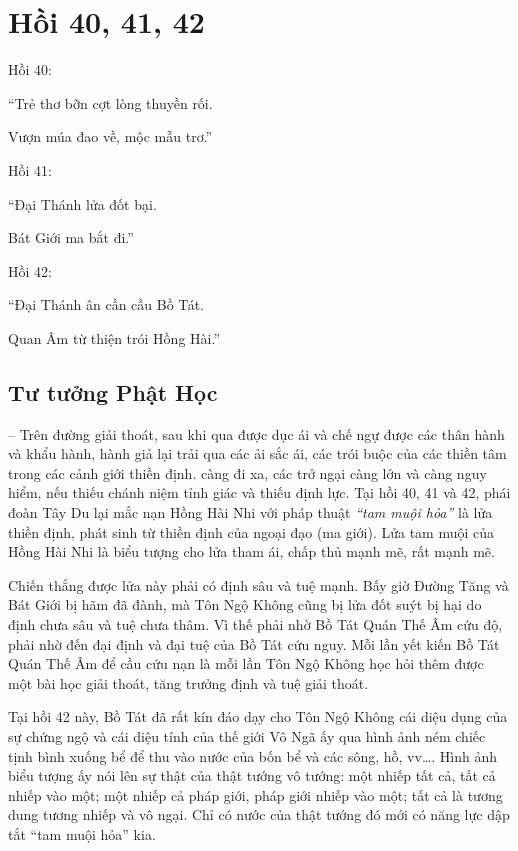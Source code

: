 \chapter{Hồi 40, 41, 42} %
\label{cha:hoi_40_41}

Hồi 40:

\begin{itshape}
``Trẻ thơ bỡn cợt lòng thuyền rối.

Vượn múa đao về, mộc mẫu trơ.''
\end{itshape}

Hồi 41:

\begin{itshape}
``Đại Thánh lửa đốt bại.

Bát Giới ma bắt đi.''
\end{itshape}

Hồi 42:

\begin{itshape}
``Đại Thánh ân cần cầu Bồ Tát.

Quan Âm từ thiện trói Hồng Hài.''
\end{itshape}

\section{Tư tưởng Phật Học} %
\label{sec:40_41_phat_hoc}

-- Trên đường giải thoát, sau khi qua được dục ái và chế ngự được các thân hành và khẩu hành, hành giả lại trải qua các ải sắc ái, các trói buộc của các thiền tâm trong các cảnh giới thiền định. càng đi xa, các trở ngại càng lớn và càng nguy hiểm, nếu thiếu chánh niệm tỉnh giác và thiếu định lực. Tại hồi 40, 41 và 42, phái đoàn Tây Du lại mắc nạn Hồng Hài Nhi với pháp thuật \emph{``tam muội hỏa''} là lửa thiền định, phát sinh từ thiền định của ngoại đạo (ma giới). Lửa tam muội của Hồng Hài Nhi là biểu tượng cho lửa tham ái, chấp thủ mạnh mẽ, rất mạnh mẽ.

Chiến thắng được lửa này phải có định sâu và tuệ mạnh. Bấy giờ Đường Tăng và Bát Giới bị hãm đã đành, mà Tôn Ngộ Không cũng bị lửa đốt suýt bị hại do định chưa sâu và tuệ chưa thâm. Vì thế phải nhờ Bồ Tát Quán Thế Âm cứu độ, phải nhờ đến đại định và đại tuệ của Bồ Tát cứu nguy. Mỗi lần yết kiến Bồ Tát Quán Thế Âm để cầu cứu nạn là mỗi lần Tôn Ngộ Không học hỏi thêm được một bài học giải thoát, tăng trưởng định và tuệ giải thoát.

Tại hồi 42 này, Bồ Tát đã rất kín đáo dạy cho Tôn Ngộ Không cái diệu dụng của sự chứng ngộ và cái diệu tính của thế giới Vô Ngã ấy qua hình ảnh ném chiếc tịnh bình xuống bể để thu vào nước của bốn bể và các sông, hồ, vv\ldots. Hình ảnh biểu tượng ấy nói lên sự thật của thật tướng vô tướng: một nhiếp tất cả, tất cả nhiếp vào một; một nhiếp cả pháp giới, pháp giới nhiếp vào một; tất cả là tương dung tương nhiếp và vô ngại. Chỉ có nước của thật tướng đó mới có năng lực dập tắt ``tam muội hỏa'' kia.

